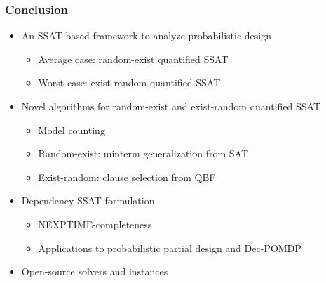 \begin{frame}
      \frametitle{Conclusion}
      \begin{itemize}
            \item An SSAT-based framework to analyze probabilistic design
                  \begin{itemize}
                        \item Average case: random-exist quantified SSAT
                        \item Worst case: exist-random quantified SSAT
                  \end{itemize}
                  \pause
            \item Novel algorithms for random-exist and exist-random quantified SSAT
                  \begin{itemize}
                        \item Model counting
                        \item Random-exist: minterm generalization from SAT
                        \item Exist-random: clause selection from QBF
                  \end{itemize}
                  \pause
            \item Dependency SSAT formulation
                  \begin{itemize}
                        \item NEXPTIME-completeness
                        \item Applications to probabilistic partial design and Dec-POMDP
                  \end{itemize}
                  \pause
            \item Open-source solvers and instances
      \end{itemize}
\end{frame}

